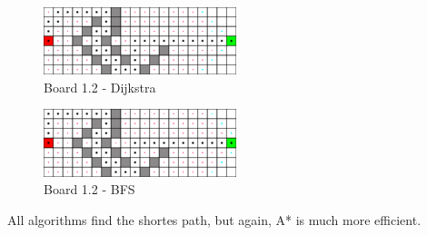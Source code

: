 \begin{figure}[h!]
  \centering
    \includegraphics[width=0.5\textwidth]{img/board-1-2-dijkstra}
    \caption{Board 1.2 - Dijkstra}
\end{figure}

\begin{figure}[h!]
  \centering
    \includegraphics[width=0.5\textwidth]{img/board-1-2-bfs}
    \caption{Board 1.2 - BFS}
\end{figure}

All algorithms find the shortes path, but again, A* is much more efficient.
